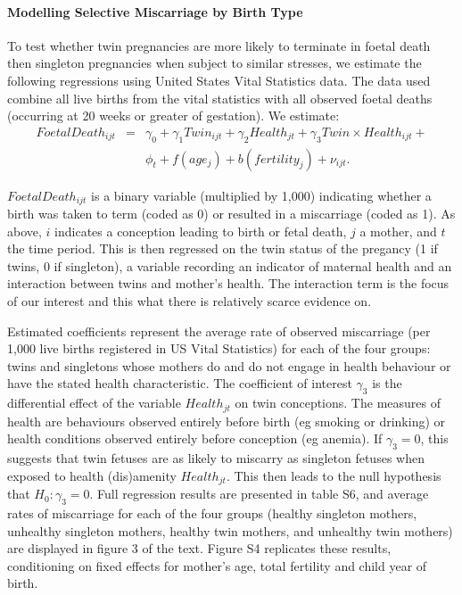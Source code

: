 \documentclass[11pt]{article}
\begin{document}
\paragraph{Modelling Selective Miscarriage by Birth Type}
To test whether twin  pregnancies are more likely to terminate in foetal death then singleton pregnancies when subject to similar stresses, we estimate the following regressions using United States Vital Statistics data.  The data used combine all live births from the vital statistics with all observed foetal deaths (occurring at 20 weeks or greater of gestation).  We estimate:
\begin{eqnarray}
  FoetalDeath_{ijt} &=& \gamma_0 + \gamma_1 Twin_{ijt} + \gamma_2 Health_{jt} + \gamma_3 Twin\times Health_{ijt} + \nonumber \\ && \phi_t + f(age_j) + b(fertility_j) + \nu_{ijt}.
\end{eqnarray}

$FoetalDeath_{ijt}$ is a binary variable (multiplied by 1,000) indicating whether a birth was taken to term (coded as 0) or resulted in a miscarriage (coded as 1).  As above, $i$ indicates a conception leading to birth or fetal death, $j$ a mother, and $t$ the time period. This is then regressed on the twin status of the pregancy (1 if twins, 0 if singleton), a variable recording an indicator of maternal health and an interaction between twins and mother's health. The interaction term is the focus of our interest and this what there is relatively scarce evidence on.

Estimated coefficients represent the average rate of observed miscarriage (per 1,000 live births registered in US Vital Statistics) for each of the four groups: twins and singletons whose mothers do and do not engage in health behaviour or have the stated health characteristic. The coefficient of interest $\gamma_3$ is the differential effect of the variable $Health_{jt}$ on twin conceptions. The measures of health are behaviours observed entirely before birth (eg smoking or drinking) or health conditions observed entirely before conception (eg anemia). If $\gamma_3=0$, this suggests that twin fetuses are as likely to miscarry as singleton fetuses when exposed to health (dis)amenity $Health_{jt}$.  This then leads to the null hypothesis that $H_0: \gamma_3=0$. Full regression results are presented in table S6, and average rates of miscarriage for each of the four groups (healthy singleton mothers, unhealthy singleton mothers, healthy twin mothers, and unhealthy twin mothers) are displayed in figure 3 of the text. Figure S4 replicates these results, conditioning on fixed effects for mother's age, total fertility and child year of birth.
\end{document}

